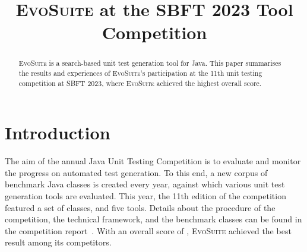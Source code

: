 \documentclass[10pt,conference]{IEEEtran}
\newcommand{\EVOSUITE}{\textsc{EvoSuite}\xspace}
\begin{document}
%

\title{\EVOSUITE at the SBFT 2023 Tool Competition}


\author{%
  \and
  \and
}

\maketitle

\begin{abstract}
  \EVOSUITE is a search-based unit test generation tool for Java. This paper summarises the results and experiences of \EVOSUITE's participation at the 11th unit testing competition at SBFT 2023, where \EVOSUITE achieved the highest overall score.
\end{abstract}


\section{Introduction}
%
The aim of the annual Java Unit Testing Competition is to evaluate and monitor
the progress on automated test generation. To this end, a new corpus of benchmark
Java classes is created every year, against which various unit test generation tools
are evaluated. This year, the 11th edition of the competition featured a set of \cuts
classes, and five tools. Details about the procedure of the competition, the
technical framework, and the benchmark classes can be found in the competition
report~\cite{SBFT-toolcomp23}. With an overall score of \score, \EVOSUITE achieved the
best result among its competitors.


\end{document}
